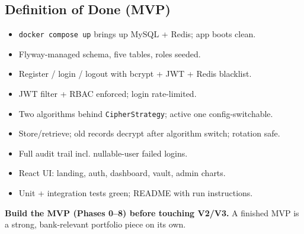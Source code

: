 \documentclass[11pt,a4paper]{article}
\newcommand{\code}[1]{\texttt{#1}}
\begin{document}
\subsection{Definition of Done (MVP)}
\begin{itemize}[leftmargin=*]
  \item \code{docker compose up} brings up MySQL + Redis; app boots clean.
  \item Flyway-managed schema, five tables, roles seeded.
  \item Register / login / logout with bcrypt + JWT + Redis blacklist.
  \item JWT filter + RBAC enforced; login rate-limited.
  \item Two algorithms behind \code{CipherStrategy}; active one config-switchable.
  \item Store/retrieve; old records decrypt after algorithm switch; rotation safe.
  \item Full audit trail incl. nullable-user failed logins.
  \item React UI: landing, auth, dashboard, vault, admin charts.
  \item Unit + integration tests green; README with run instructions.
\end{itemize}

\vspace{1em}
\begin{note}
\textbf{Build the MVP (Phases 0–8) before touching V2/V3.} A finished MVP is a strong,
bank-relevant portfolio piece on its own.
\end{note}
\end{document}
